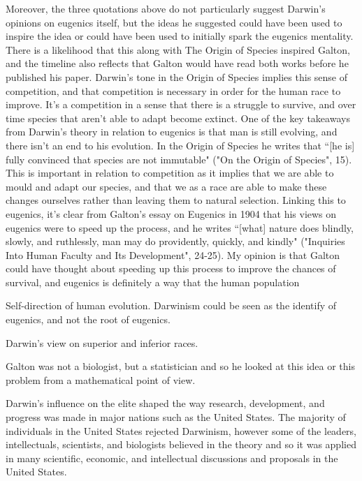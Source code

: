 \documentclass[11pt, oneside]{article}
\begin{document}
\par Moreover, the three quotations above do not particularly suggest Darwin's opinions on eugenics itself, but the ideas he suggested could have been used to inspire the idea or could have been used to initially spark the eugenics mentality. There is a likelihood that this along with The Origin of Species inspired Galton, and the timeline also reflects that Galton would have read both works before he published his paper. Darwin's tone in the Origin of Species implies this sense of competition, and that competition is necessary in order for the human race to improve. It's a competition in a sense that there is a struggle to survive, and over time species that aren't able to adapt become extinct. One of the key takeaways from Darwin's theory in relation to eugenics is that man is still evolving, and there isn't an end to his evolution. In the Origin of Species he writes that ``[he is] fully convinced that species are not immutable" ("On the Origin of Species", 15). This is important in relation to competition as it implies that we are able to mould and adapt our species, and that we as a race are able to make these changes ourselves rather than leaving them to natural selection. Linking this to eugenics, it's clear from Galton's essay on Eugenics in 1904 that his views on eugenics were to speed up the process, and he writes ``[what] nature does blindly, slowly, and ruthlessly, man may do providently, quickly, and kindly" ("Inquiries Into Human Faculty and Its Development", 24-25). My opinion is that Galton could have thought about speeding up this process to improve the chances of survival, and eugenics is definitely a way that the human population

\par Self-direction of human evolution. Darwinism could be seen as the identify of eugenics, and not the root of eugenics.
\par Darwin's view on superior and inferior races. 
\par Galton was not a biologist, but a statistician and so he looked at this idea or this problem from a mathematical point of view. 

\par Darwin's influence on the elite shaped the way research, development, and progress was made in major nations such as the United States. The majority of individuals in the United States rejected Darwinism, however some of the leaders, intellectuals, scientists, and biologists believed in the theory and so it was applied in many scientific, economic, and intellectual discussions and proposals in the United States. 
\end{document}
